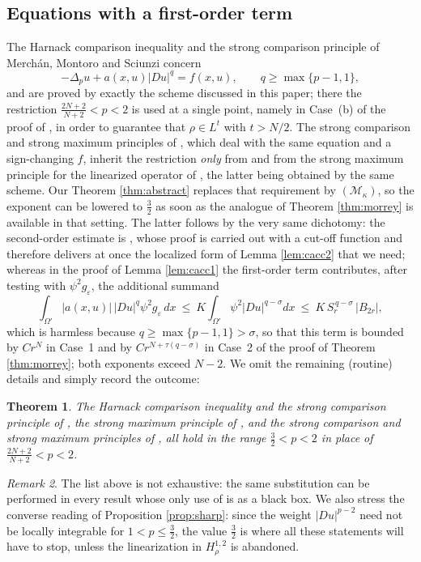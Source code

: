 \documentclass[reqno]{amsart}
\theoremstyle{plain}
\newtheorem{theorem}{Theorem}
\theoremstyle{definition}
\theoremstyle{remark}
\newtheorem{remark}[theorem]{Remark}
\newcommand{\eps}{\varepsilon}
\begin{document}
\subsection{Equations with a first-order term}
The Harnack comparison inequality and the strong comparison principle of Merch\'an, Montoro and
Sciunzi \cite[Theorems 1.1--1.2]{MMS} concern
\[
-\Delta_pu+a(x,u)|Du|^{q}=f(x,u),\qquad q\ge\max\{p-1,1\},
\]
and are proved by exactly the scheme discussed in this paper; there the restriction
$\frac{2N+2}{N+2}<p<2$ is used at a single point, namely in Case~(b) of the proof of
\cite[Theorem 3.1]{MMS}, in order to guarantee that $\rho\in L^{t}$ with $t>N/2$. The strong
comparison and strong maximum principles of \cite[Theorems 1--3]{Le}, which deal with the same
equation and a sign-changing $f$, inherit the restriction \emph{only} from
\cite[Theorem 1.2]{MMS} and from the strong maximum principle for the linearized operator of
\cite[Theorem 1.4]{Mon}, the latter being obtained by the same scheme. Our Theorem \ref{thm:abstract} replaces that requirement by
$(\mathcal M_\kappa)$, so the exponent can be lowered to $\frac32$ as soon as the analogue of
Theorem \ref{thm:morrey} is available in that setting. The latter follows by the very same
dichotomy: the second-order estimate is \cite[Theorem 2.1]{MMS}, whose proof is carried out with a
cut-off function and therefore delivers at once the localized form of Lemma \ref{lem:cacc2} that we
need; whereas in the proof of Lemma \ref{lem:cacc1} the first-order term contributes, after testing
with $\psi^2g_\eps$, the additional summand
\[
\int_{\Omega'}|a(x,u)|\,|Du|^{q}\psi^2g_\eps\,dx\ \le\ K\int_{\Omega'}\psi^2|Du|^{q-\sigma}dx
\ \le\ K\,S_r^{\,q-\sigma}\,|B_{2r}| ,
\]
which is harmless because $q\ge\max\{p-1,1\}>\sigma$, so that this term is bounded by $Cr^{N}$ in
Case~1 and by $Cr^{N+\tau(q-\sigma)}$ in Case~2 of the proof of Theorem \ref{thm:morrey}; both
exponents exceed $N-2$. We omit the remaining (routine) details and simply record the outcome:

\begin{theorem}\label{thm:firstorder}
The Harnack comparison inequality and the strong comparison principle of
\cite[Theorems 1.1--1.2]{MMS}, the strong maximum principle of \cite[Theorem 1.4]{Mon}, and the
strong comparison and strong maximum principles of \cite[Theorems 1--3]{Le}, all hold in the range
$\frac32<p<2$ in place of $\frac{2N+2}{N+2}<p<2$.
\end{theorem}

\begin{remark}
The list above is not exhaustive: the same substitution can be performed in every result whose only
use of \cite[Theorems 1.2 and 1.4]{DS2} is as a black box. We also stress the converse reading of
Proposition \ref{prop:sharp}: since the weight $|Du|^{p-2}$ need not be locally integrable for
$1<p\le\frac32$, the value $\frac32$ is where all these statements will have to stop, unless the
linearization in $H^{1,2}_{\rho}$ is abandoned.
\end{remark}
\end{document}
